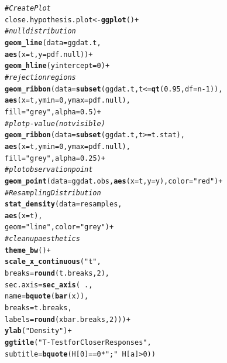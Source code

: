 \documentclass{article}\usepackage[]{graphicx}\usepackage[]{xcolor}
\makeatletter
\newcommand{\hlnum}[1]{\textcolor[rgb]{0.686,0.059,0.569}{#1}}%
\newcommand{\hlsng}[1]{\textcolor[rgb]{0.192,0.494,0.8}{#1}}%
\newcommand{\hlcom}[1]{\textcolor[rgb]{0.678,0.584,0.686}{\textit{#1}}}%
\newcommand{\hlopt}[1]{\textcolor[rgb]{0,0,0}{#1}}%
\newcommand{\hldef}[1]{\textcolor[rgb]{0.345,0.345,0.345}{#1}}%
\newcommand{\hlkwb}[1]{\textcolor[rgb]{0.69,0.353,0.396}{#1}}%
\newcommand{\hlkwc}[1]{\textcolor[rgb]{0.333,0.667,0.333}{#1}}%
\newcommand{\hlkwd}[1]{\textcolor[rgb]{0.737,0.353,0.396}{\textbf{#1}}}%
\newenvironment{kframe}{%
 \def\at@end@of@kframe{}%
 \ifinner\ifhmode%
  \def\at@end@of@kframe{\end{minipage}}%
  \begin{minipage}{\columnwidth}%
 \fi\fi%
 \def\FrameCommand##1{\hskip\@totalleftmargin \hskip-\fboxsep
 \colorbox{shadecolor}{##1}\hskip-\fboxsep
     \hskip-\linewidth \hskip-\@totalleftmargin \hskip\columnwidth}%
 \MakeFramed {\advance\hsize-\width
   \@totalleftmargin\z@ \linewidth\hsize
   \@setminipage}}%
 {\par\unskip\endMakeFramed%
 \at@end@of@kframe}
\newenvironment{knitrout}{}{} %
\makeatother
\begin{document}
\begin{enumerate}
\begin{enumerate}
\begin{knitrout}
\begin{kframe}
\begin{alltt}
\hlcom{# Create Plot}
\hldef{close.hypothesis.plot} \hlkwb{<-} \hlkwd{ggplot}\hldef{()} \hlopt{+}
  \hlcom{# null distribution}
  \hlkwd{geom_line}\hldef{(}\hlkwc{data}\hldef{=ggdat.t,}
            \hlkwd{aes}\hldef{(}\hlkwc{x}\hldef{=t,} \hlkwc{y}\hldef{=pdf.null))}\hlopt{+}
  \hlkwd{geom_hline}\hldef{(}\hlkwc{yintercept}\hldef{=}\hlnum{0}\hldef{)}\hlopt{+}
  \hlcom{# rejection regions}
  \hlkwd{geom_ribbon}\hldef{(}\hlkwc{data}\hldef{=}\hlkwd{subset}\hldef{(ggdat.t, t}\hlopt{<=}\hlkwd{qt}\hldef{(}\hlnum{0.95}\hldef{,} \hlkwc{df}\hldef{=n}\hlopt{-}\hlnum{1}\hldef{)),}
              \hlkwd{aes}\hldef{(}\hlkwc{x}\hldef{=t,} \hlkwc{ymin}\hldef{=}\hlnum{0}\hldef{,} \hlkwc{ymax}\hldef{=pdf.null),}
              \hlkwc{fill}\hldef{=}\hlsng{"grey"}\hldef{,} \hlkwc{alpha}\hldef{=}\hlnum{0.5}\hldef{)}\hlopt{+}
  \hlcom{# plot p-value (not visible)}
  \hlkwd{geom_ribbon}\hldef{(}\hlkwc{data}\hldef{=}\hlkwd{subset}\hldef{(ggdat.t, t}\hlopt{>=}\hldef{t.stat),}
              \hlkwd{aes}\hldef{(}\hlkwc{x}\hldef{=t,} \hlkwc{ymin}\hldef{=}\hlnum{0}\hldef{,} \hlkwc{ymax}\hldef{=pdf.null),}
              \hlkwc{fill}\hldef{=}\hlsng{"grey"}\hldef{,} \hlkwc{alpha}\hldef{=}\hlnum{0.25}\hldef{)}\hlopt{+}
  \hlcom{# plot observation point}
  \hlkwd{geom_point}\hldef{(}\hlkwc{data}\hldef{=ggdat.obs,} \hlkwd{aes}\hldef{(}\hlkwc{x}\hldef{=t,} \hlkwc{y}\hldef{=y),} \hlkwc{color}\hldef{=}\hlsng{"red"}\hldef{)}\hlopt{+}
  \hlcom{# Resampling Distribution}
  \hlkwd{stat_density}\hldef{(}\hlkwc{data}\hldef{=resamples,}
               \hlkwd{aes}\hldef{(}\hlkwc{x}\hldef{=t),}
               \hlkwc{geom}\hldef{=}\hlsng{"line"}\hldef{,} \hlkwc{color}\hldef{=}\hlsng{"grey"}\hldef{)}\hlopt{+}
  \hlcom{# clean up aesthetics}
  \hlkwd{theme_bw}\hldef{()}\hlopt{+}
  \hlkwd{scale_x_continuous}\hldef{(}\hlsng{"t"}\hldef{,}
                     \hlkwc{breaks} \hldef{=} \hlkwd{round}\hldef{(t.breaks,}\hlnum{2}\hldef{),}
                     \hlkwc{sec.axis} \hldef{=} \hlkwd{sec_axis}\hldef{(}\hlopt{~}\hldef{.,}
                                         \hlkwc{name} \hldef{=} \hlkwd{bquote}\hldef{(}\hlkwd{bar}\hldef{(x)),}
                                         \hlkwc{breaks} \hldef{= t.breaks,}
                                         \hlkwc{labels} \hldef{=} \hlkwd{round}\hldef{(xbar.breaks,}\hlnum{2}\hldef{)))}\hlopt{+}
  \hlkwd{ylab}\hldef{(}\hlsng{"Density"}\hldef{)}\hlopt{+}
  \hlkwd{ggtitle}\hldef{(}\hlsng{"T-Test for Closer Responses"}\hldef{,}
          \hlkwc{subtitle}\hldef{=}\hlkwd{bquote}\hldef{(H[}\hlnum{0}\hldef{]}\hlopt{==}\hlnum{0}\hlopt{*}\hlsng{";"}\hlopt{~}\hldef{H[a]}\hlopt{>}\hlnum{0}\hldef{))}
\end{alltt}
\end{kframe}
\end{knitrout}


\end{enumerate}
\end{enumerate}
\end{document}
